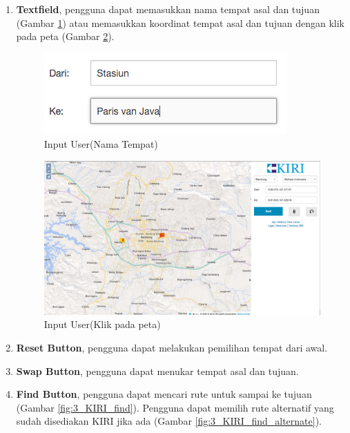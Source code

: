 \begin{enumerate}
\begin{enumerate}
			\item \textbf{Textfield}, pengguna dapat memasukkan nama tempat asal dan tujuan  (Gambar \ref{fig:3_KIRI_textfield_nama}) atau memasukkan koordinat tempat asal dan tujuan dengan klik pada peta (Gambar \ref{fig:3_KIRI_textfield_koord}).
			\begin{figure}[H]
				\centering
				\includegraphics[scale=0.5]{Gambar/KIRI-textfield-nama}
				\caption{Input User(Nama Tempat)} 
				\label{fig:3_KIRI_textfield_nama}
			\end{figure}
			
			\begin{figure}[H]
				\centering
				\includegraphics[scale=0.3]{Gambar/KIRI-textfield-koord}
				\caption{Input User(Klik pada peta)} 
				\label{fig:3_KIRI_textfield_koord}
			\end{figure}
		
			\item \textbf{Reset Button}, pengguna dapat melakukan pemilihan tempat dari awal.
			\item \textbf{Swap Button}, pengguna dapat menukar tempat asal dan tujuan.
			\item \textbf{Find Button}, pengguna dapat mencari rute untuk sampai ke tujuan (Gambar \ref{fig:3_KIRI_find}). Pengguna dapat memilih rute alternatif yang sudah disediakan KIRI jika ada (Gambar \ref{fig:3_KIRI_find_alternate}).
			

\end{enumerate}
\end{enumerate}
